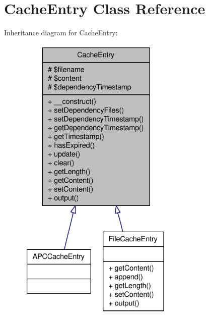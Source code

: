 \hypertarget{classCacheEntry}{
\section{CacheEntry Class Reference}
\label{classCacheEntry}
}


Inheritance diagram for CacheEntry:\nopagebreak
\begin{figure}[H]
\begin{center}
\leavevmode
\includegraphics[height=400pt]{classCacheEntry__inherit__graph}
\end{center}
\end{figure}
